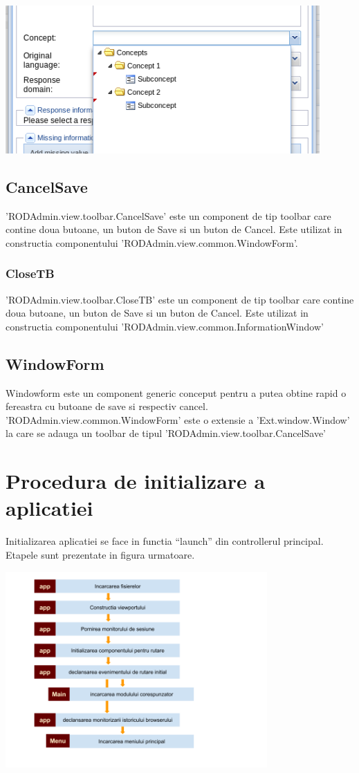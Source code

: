 \includegraphics[width=12cm]{img/treecombo}


\subsection{CancelSave}

'RODAdmin.view.toolbar.CancelSave' este un component de tip toolbar care contine doua butoane, un buton de Save si un buton de Cancel. Este utilizat in constructia componentului 'RODAdmin.view.common.WindowForm'.


\subsubsection{CloseTB}

'RODAdmin.view.toolbar.CloseTB' este un component de tip toolbar care contine doua butoane, un buton de Save si un buton de Cancel. Este utilizat in constructia componentului 'RODAdmin.view.common.InformationWindow'

\subsection{WindowForm}

Windowform este un component generic conceput pentru a putea obtine rapid o fereastra cu butoane de save si respectiv cancel. 'RODAdmin.view.common.WindowForm' este o extensie a 'Ext.window.Window' la care se adauga un toolbar de tipul 'RODAdmin.view.toolbar.CancelSave'


\section{Procedura de initializare a aplicatiei}

Initializarea aplicatiei se face in functia “launch” din controllerul principal. Etapele sunt prezentate in figura urmatoare.


\includegraphics[width=10cm]{img/app-launch}

